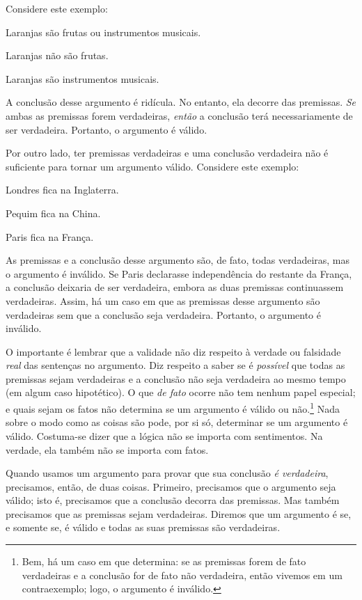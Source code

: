 Considere este exemplo:
	\begin{earg}
		\item[] Laranjas são frutas ou instrumentos musicais.
		\item[] Laranjas não são frutas.
		\item[\texttherefore] Laranjas são instrumentos musicais.
	\end{earg}
A conclusão desse argumento é ridícula. No entanto, ela decorre das premissas. \emph{Se} ambas as premissas forem verdadeiras, \emph{então} a conclusão terá necessariamente de ser verdadeira. Portanto, o argumento é válido.

Por outro lado, ter premissas verdadeiras e uma conclusão verdadeira não é suficiente para tornar um argumento válido. Considere este exemplo:
	\begin{earg}
		\item[] Londres fica na Inglaterra.
		\item[] Pequim fica na China.
		\item[\texttherefore] Paris fica na França.
	\end{earg}
As premissas e a conclusão desse argumento são, de fato, todas verdadeiras, mas o argumento é inválido. Se Paris declarasse independência do restante da França, a conclusão deixaria de ser verdadeira, embora as duas premissas continuassem verdadeiras. Assim, há um caso em que as premissas desse argumento são verdadeiras sem que a conclusão seja verdadeira. Portanto, o argumento é inválido.

O importante é lembrar que a validade não diz respeito à verdade ou falsidade \emph{real} das sentenças no argumento. Diz respeito a saber se é \emph{possível} que todas as premissas sejam verdadeiras e a conclusão não seja verdadeira ao mesmo tempo (em algum caso hipotético). O que \emph{de fato} ocorre não tem nenhum papel especial; e quais sejam os fatos não determina se um argumento é válido ou não.\footnote{Bem, há um caso em que determina: se as premissas forem de fato verdadeiras e a conclusão for de fato não verdadeira, então vivemos em um contraexemplo; logo, o argumento é inválido.} Nada sobre o modo como as coisas são pode, por si só, determinar se um argumento é válido. Costuma-se dizer que a lógica não se importa com sentimentos. Na verdade, ela também não se importa com fatos.

Quando usamos um argumento para provar que sua conclusão \emph{é verdadeira}, precisamos, então, de duas coisas. Primeiro, precisamos que o argumento seja válido; isto é, precisamos que a conclusão decorra das premissas. Mas também precisamos que as premissas sejam verdadeiras. Diremos que um argumento é  se, e somente se, é válido e todas as suas premissas são verdadeiras.

